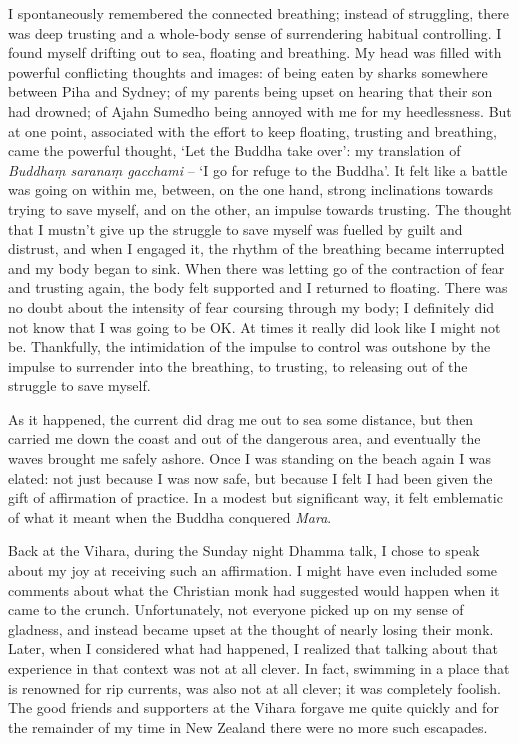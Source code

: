 I spontaneously remembered the connected breathing; instead of
struggling, there was deep trusting and a whole-body sense of
surrendering habitual controlling. I found myself drifting out to sea,
floating and breathing. My head was filled with powerful conflicting
thoughts and images: of being eaten by sharks somewhere between Piha and
Sydney; of my parents being upset on hearing that their son had drowned;
of Ajahn Sumedho being annoyed with me for my heedlessness. But at one
point, associated with the effort to keep floating, trusting and
breathing, came the powerful thought, `Let the Buddha take over': my
translation of \emph{Buddhaṃ saranaṃ gacchami} -- `I go for refuge to
the Buddha'. It felt like a battle was going on within me, between, on
the one hand, strong inclinations towards trying to save myself, and on
the other, an impulse towards trusting. The thought that I mustn't give
up the struggle to save myself was fuelled by guilt and distrust, and
when I engaged it, the rhythm of the breathing became interrupted and my
body began to sink. When there was letting go of the contraction of fear
and trusting again, the body felt supported and I returned to floating.
There was no doubt about the intensity of fear coursing through my body;
I definitely did not know that I was going to be OK. At times it really
did look like I might not be. Thankfully, the intimidation of the
impulse to control was outshone by the impulse to surrender into the
breathing, to trusting, to releasing out of the struggle to save myself.

As it happened, the current did drag me out to sea some distance, but
then carried me down the coast and out of the dangerous area, and
eventually the waves brought me safely ashore. Once I was standing on
the beach again I was elated: not just because I was now safe, but
because I felt I had been given the gift of affirmation of practice. In
a modest but significant way, it felt emblematic of what it meant when
the Buddha conquered \emph{Mara}.

Back at the Vihara, during the Sunday night Dhamma talk, I chose to
speak about my joy at receiving such an affirmation. I might have even
included some comments about what the Christian monk had suggested would
happen when it came to the crunch. Unfortunately, not everyone picked up
on my sense of gladness, and instead became upset at the thought of
nearly losing their monk. Later, when I considered what had happened, I
realized that talking about that experience in that context was not at
all clever. In fact, swimming in a place that is renowned for rip
currents, was also not at all clever; it was completely foolish. The
good friends and supporters at the Vihara forgave me quite quickly and
for the remainder of my time in New Zealand there were no more such
escapades.

